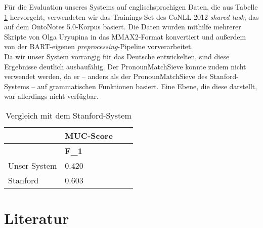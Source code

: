 \documentclass{scrartcl}
\begin{document}
\clearpage
Für die Evaluation unseres Systems auf englischsprachigen Daten, die aus Tabelle \ref{tab:ml_vergleich} hervorgeht, verwendeten wir das Trainings-Set des CoNLL-2012 \textit{shared task}, das auf dem OntoNotes 5.0-Korpus basiert. Die Daten wurden mithilfe mehrerer Skripte von Olga Uryupina in das MMAX2-Format konvertiert und außerdem von der BART-eigenen \textit{preprocessing}-Pipeline vorverarbeitet.\\
Da wir unser System vorrangig für das Deutsche entwickelten, sind diese Ergebnisse deutlich ausbaufähig. Der PronounMatchSieve konnte zudem nicht verwendet werden, da er -- anders als der PronounMatchSieve des Stanford-Systems -- auf grammatischen Funktionen basiert. Eine Ebene, die diese darstellt, war allerdings nicht verfügbar. \\

\begin{table}[h]
\begin{tabular}{l||ll|l}
& \multicolumn{1}{c}{\textbf{MUC-Score}} \\ \hline
          &    \textbf{F\_1}    \\ \hline
Unser System &	  0.420  \\
Stanford   &	0.603
\end{tabular}
\caption{Vergleich mit dem Stanford-System}
\label{tab:ml_vergleich}
\end{table}


\clearpage

\nocite{*}
\renewcommand*{\refname}{} %
\section{Literatur}  
{}

\end{document}
